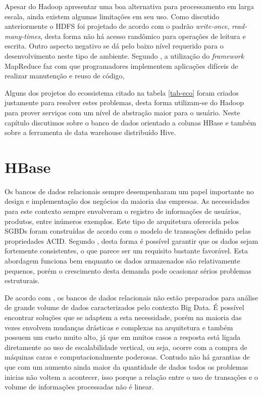 Apesar do Hadoop apresentar uma boa alternativa para processamento em larga escala, ainda existem algumas limitações em seu uso. Como discutido anteriormente o HDFS foi projetado de acordo com o padrão \textit{write-once}, \textit{read-many-times}, desta forma não há acesso randômico para operações de leitura e escrita. Outro aspecto negativo se dá pelo baixo nível requerido para o desenvolvimento neste tipo de ambiente. Segundo , a utilização do \textit{framework} MapReduce faz com que programadores implementem aplicações difíceis de realizar manutenção e reuso de código,

Alguns dos projetos do ecossistema citado na tabela \ref{tab-eco} foram criados justamente para resolver estes problemas, desta forma utilizam-se do Hadoop para prover serviços com um nível de abstração maior para o usuário. Neste capítulo discutimos sobre o banco de dados orientado a colunas HBase e também sobre a ferramenta de data warehouse distribuído Hive.

\section{HBase}

Os bancos de dados relacionais sempre desempenharam um papel importante no design e implementação dos negócios da maioria das empresas. As necessidades para este contexto sempre envolveram o registro de informações de usuários, produtos, entre inúmeros exemplos. Este tipo de arquitetura oferecida pelos SGBDs foram construídas de acordo com o modelo de transações definido pelas propriedades ACID. Segundo , desta forma é possível garantir que os dados sejam fortemente consistentes, o que parece ser um requisito bastante favorável. Esta abordagem funciona bem enquanto os dados armazenados são relativamente pequenos, porém o crescimento desta demanda pode ocasionar sérios problemas estruturais.

De acordo com , os bancos de dados relacionais não estão preparados para análise de grande volume de dados caracterizados pelo contexto Big Data. É possível encontrar soluções que se adaptem a esta necessidade, porém na maioria das vezes envolvem mudanças drásticas e complexas na arquitetura e também possuem um custo muito alto, já que em muitos casos a resposta está ligada diretamente ao uso de escalabilidade vertical, ou seja, ocorre com a compra de máquinas caras e computacionalmente poderosas. Contudo não há garantias de que com um aumento ainda maior da quantidade de dados todos os problemas inicias não voltem a acontecer, isso porque a relação entre o uso de transações e o volume de informações processadas não é linear.

